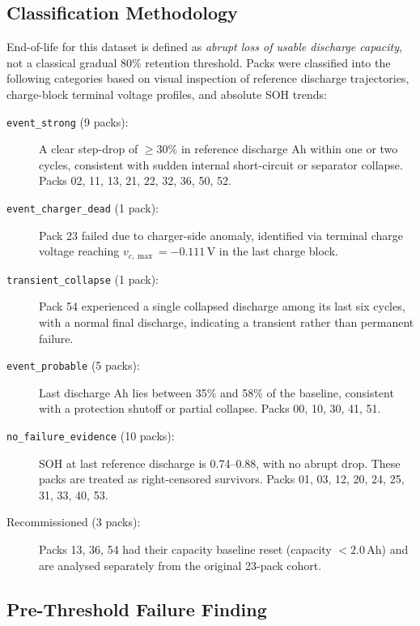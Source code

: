 \subsection{Classification Methodology}

End-of-life for this dataset is defined as \emph{abrupt loss of
usable discharge capacity}, not a classical gradual 80\% retention
threshold.  Packs were classified into the following categories based
on visual inspection of reference discharge trajectories,
charge-block terminal voltage profiles, and absolute SOH trends:

\begin{description}
  \item[\texttt{event\_strong} (9 packs):] A clear step-drop of
  $\geq 30\%$ in reference discharge Ah within one or two cycles,
  consistent with sudden internal short-circuit or separator collapse.
  Packs 02, 11, 13, 21, 22, 32, 36, 50, 52.

  \item[\texttt{event\_charger\_dead} (1 pack):] Pack 23 failed due
  to charger-side anomaly, identified via terminal charge voltage
  reaching $v_{c,\max} = -0.111\,\mathrm{V}$ in the last charge block.

  \item[\texttt{transient\_collapse} (1 pack):] Pack 54 experienced
  a single collapsed discharge among its last six cycles, with a
  normal final discharge, indicating a transient rather than
  permanent failure.

  \item[\texttt{event\_probable} (5 packs):] Last discharge Ah lies
  between 35\% and 58\% of the baseline, consistent with a
  protection shutoff or partial collapse.  Packs 00, 10, 30, 41, 51.

  \item[\texttt{no\_failure\_evidence} (10 packs):] SOH at last
  reference discharge is 0.74--0.88, with no abrupt drop.
  These packs are treated as right-censored survivors.
  Packs 01, 03, 12, 20, 24, 25, 31, 33, 40, 53.

  \item[Recommissioned (3 packs):] Packs 13, 36, 54 had their
  capacity baseline reset (capacity $< 2.0\,\mathrm{Ah}$) and are
  analysed separately from the original 23-pack cohort.
\end{description}

\subsection{Pre-Threshold Failure Finding}

